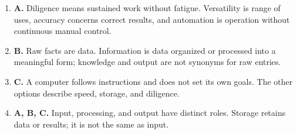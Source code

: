 \begin{enumerate}[label=\textbf{Q\arabic*.}, leftmargin=*]
\item \textbf{A.} Diligence means sustained work without fatigue. Versatility is range of uses, accuracy concerns correct results, and automation is operation without continuous manual control.

\item \textbf{B.} Raw facts are data. Information is data organized or processed into a meaningful form; knowledge and output are not synonyms for raw entries.

\item \textbf{C.} A computer follows instructions and does not set its own goals. The other options describe speed, storage, and diligence.

\item \textbf{A, B, C.} Input, processing, and output have distinct roles. Storage retains data or results; it is not the same as input.

\end{enumerate}
